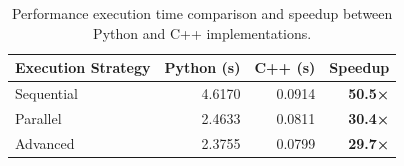 
\begin{table}[htbp]
    \centering
    \caption{Performance execution time comparison and speedup between Python and C++ implementations.}
    \label{tab:cbn_performance_speedup}
    \begin{tabular}{lrrr}
        \hline
        \textbf{Execution Strategy} & \textbf{Python (s)} & \textbf{C++ (s)} & \textbf{Speedup} \\ \hline
        Sequential & 4.6170 & 0.0914 & \textbf{50.5×} \\
        Parallel   & 2.4633 & 0.0811 & \textbf{30.4×} \\
        Advanced   & 2.3755 & 0.0799 & \textbf{29.7×} \\ \hline
    \end{tabular}
\end{table}
